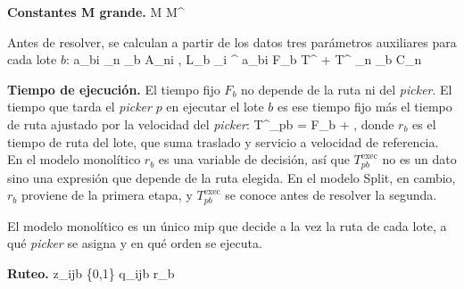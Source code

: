 {\bf Constantes M grande.}
\startformula
	\startalign[n=2, align={right,left}]
		\NC M \NC \quad {} \NR
		\NC M^{} \NC \quad {} \NR
	\stopalign
\stopformula

\stopsubsection

\startsubsection[title={Parámetros derivados}]

Antes de resolver, se calculan a partir de los datos tres parámetros
auxiliares para cada lote $b$:
\startformula
	\startalign[n=3, align={right,left,left}]
		\NC a_{bi} \EQ
			\startcases
				 \NC {} \sum_{n \in {}_b} A_{ni} , \NR
				 \NC {} \NR
			\stopcases
		\NC \qquad {} \NR
		\NC L_b \EQ \sum_{i \in {}^{}} a_{bi} \NC \qquad {} \NR
		\NC F_b \EQ T^{} + T^{} \sum_{n \in {}_b} C_n \NC \qquad {} \NR
	\stopalign
\stopformula

{\bf Tiempo de ejecución.} El tiempo fijo $F_b$ no depende de la ruta ni del
{\em picker}. El tiempo que tarda el {\em picker} $p$ en ejecutar el lote $b$
es ese tiempo fijo más el tiempo de ruta ajustado por la velocidad del
{\em picker}:
\startplaceformula[reference=eq:texec]
\startformula
	T^{}_{pb} = F_b + ,
\stopformula
\stopplaceformula
donde $r_b$ es el tiempo de ruta del lote, que suma traslado y servicio a
velocidad de referencia. En el modelo monolítico $r_b$ es una variable de
decisión, así que $T^{\text{exec}}_{pb}$ no es un dato sino una expresión que
depende de la ruta elegida. En el modelo Split, en cambio, $r_b$ proviene de
la primera etapa, y $T^{\text{exec}}_{pb}$ se conoce antes de resolver la
segunda.

\stopsubsection
\stopsection

\startsection[title={Modelo monolítico}, reference=sec:modelo_monolitico]

El modelo monolítico es un único \ac{mip} que decide a la vez la ruta de cada
lote, a qué {\em picker} se asigna y en qué orden se ejecuta.

\startsubsection[title={Variables de decisión}]

{\bf Ruteo.}
\startformula
	\startalign[n=2, align={right,left}]
		\NC z_{ijb} \in \{0,1\} \NC \quad {} \NR
		\NC q_{ijb}  \NC \quad {} \NR
		\NC r_b  \NC \quad {} \NR
	\stopalign
\stopformula


